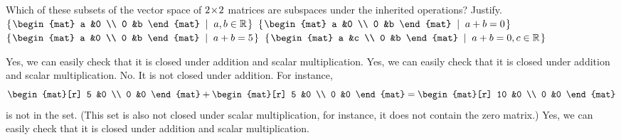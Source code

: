 

\begin{Exercise}[
name={},
title={}, 
difficulty=0,
origin={\cite{JH}}]
Which of these subsets of the vector space of \( 2 \! \times \! 2 \) matrices
    are subspaces under the inherited operations? Justify.
\Question \( \set{\begin{mat}
                      a  &0  \\
                      0  &b
                    \end{mat}  \suchthat a,b\in\Re}  \)
\Question \( \set{\begin{mat}
                      a  &0  \\
                      0  &b
                    \end{mat}  \suchthat a+b=0} \)
\Question \( \set{\begin{mat}
                      a  &0  \\
                      0  &b
                    \end{mat}  \suchthat a+b=5} \)
\Question \( \set{\begin{mat}
                      a  &c  \\
                      0  &b
                    \end{mat}  \suchthat a+b=0, c\in\Re} \)

\end{Exercise}

\begin{Answer}
\Question Yes, we can easily check that it is closed under addition and scalar multiplication.
\Question Yes, we can easily check that it is closed under addition and scalar multiplication. 
\Question No.
          It is not closed under addition.
          For instance, 
          \begin{equation*}
            \begin{mat}[r]
              5  &0  \\
              0  &0
            \end{mat}
            +\begin{mat}[r]
              5  &0  \\
              0  &0
            \end{mat}
            =\begin{mat}[r]
              10  &0  \\
              0  &0
            \end{mat}
          \end{equation*}
          is not in the set.
          (This set is also not closed under scalar multiplication,
          for instance, it does not contain the zero matrix.)
\Question Yes, we can easily check that it is closed under addition and scalar multiplication.
\end{Answer}

